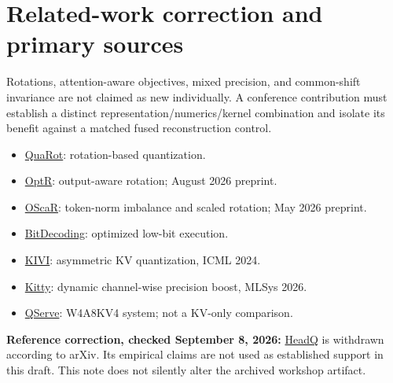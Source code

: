 \documentclass[11pt]{article}
\begin{document}
\section{Related-work correction and primary sources}
Rotations, attention-aware objectives, mixed precision, and common-shift
invariance are not claimed as new individually. A conference contribution must
establish a distinct representation/numerics/kernel combination and isolate its
benefit against a matched fused reconstruction control.
\begin{itemize}
\item \href{https://arxiv.org/abs/2404.00456}{QuaRot}: rotation-based quantization.
\item \href{https://arxiv.org/abs/2608.02691}{OptR}: output-aware rotation; August 2026 preprint.
\item \href{https://arxiv.org/abs/2605.19660}{OScaR}: token-norm imbalance and scaled rotation; May 2026 preprint.
\item \href{https://arxiv.org/abs/2503.18773}{BitDecoding}: optimized low-bit execution.
\item \href{https://arxiv.org/abs/2402.02750}{KIVI}: asymmetric KV quantization, ICML 2024.
\item \href{https://proceedings.mlsys.org/paper_files/paper/2026/hash/e4d8d1b5120be349d3fff8878650cf45-Abstract-Conference.html}{Kitty}: dynamic channel-wise precision boost, MLSys 2026.
\item \href{https://arxiv.org/abs/2405.04532}{QServe}: W4A8KV4 system; not a KV-only comparison.
\end{itemize}
\noindent\textbf{Reference correction, checked September 8, 2026:}
\href{https://arxiv.org/abs/2605.03562}{HeadQ} is withdrawn according to arXiv.
Its empirical claims are not used as established support in this draft. This
note does not silently alter the archived workshop artifact.
\end{document}

